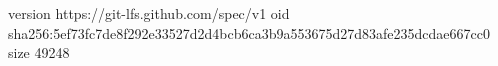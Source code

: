 version https://git-lfs.github.com/spec/v1
oid sha256:5ef73fc7de8f292e33527d2d4bcb6ca3b9a553675d27d83afe235dcdae667cc0
size 49248
